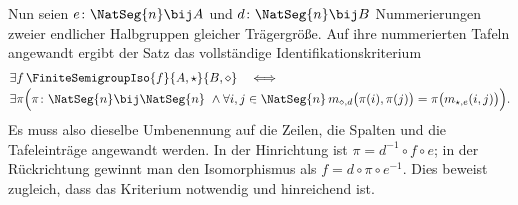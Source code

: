 \documentclass[main.tex]{subfiles}
\begin{document}
\begin{tabproofsplitwide}
  \closeproofpartwide
\end{tabproofsplitwide}

Nun seien \(e\colon\NatSeg{n}\bij A\) und
\(d\colon\NatSeg{n}\bij B\) Nummerierungen zweier endlicher
Halbgruppen gleicher Trägergröße.  Auf ihre nummerierten Tafeln
angewandt ergibt der Satz das vollständige Identifikationskriterium
\[
\begin{aligned}
&\exists f\,
  \FiniteSemigroupIso{f}{A,\star}{B,\diamond}
\quad\Longleftrightarrow{}\\[-2pt]
&\exists\pi\Bigl(
  \pi\colon\NatSeg{n}\bij\NatSeg{n}\ \land
  \forall i,j\in\NatSeg{n}\,
  m_{\diamond,d}\bigl(\pi(i),\pi(j)\bigr)
    =\pi\bigl(m_{\star,e}(i,j)\bigr)
  \Bigr).
\end{aligned}
\]
Es muss also dieselbe Umbenennung auf die Zeilen, die Spalten und die
Tafeleinträge angewandt werden.  In der Hinrichtung ist
\(\pi=d^{-1}\circ f\circ e\); in der Rückrichtung gewinnt man den
Isomorphismus als \(f=d\circ\pi\circ e^{-1}\).  Dies beweist zugleich,
dass das Kriterium notwendig und hinreichend ist.
\end{document}

